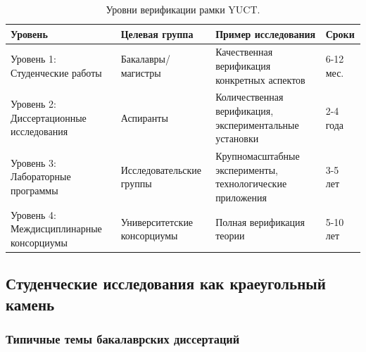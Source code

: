 \documentclass[12pt,a4paper]{article}
\begin{document}
	\begin{table}[h]
		\centering
		\begin{tabular}{p{}p{}p{}p{}}
			\toprule
			\textbf{Уровень} & \textbf{Целевая группа} & \textbf{Пример исследования} & \textbf{Сроки} \\
			\midrule
			Уровень 1: Студенческие работы & Бакалавры/магистры & Качественная верификация конкретных аспектов & 6-12 мес. \\
			Уровень 2: Диссертационные исследования & Аспиранты & Количественная верификация, экспериментальные установки & 2-4 года \\
			Уровень 3: Лабораторные программы & Исследовательские группы & Крупномасштабные эксперименты, технологические приложения & 3-5 лет \\
			Уровень 4: Междисциплинарные консорциумы & Университетские консорциумы & Полная верификация теории & 5-10 лет \\
			\bottomrule
		\end{tabular}
		\caption{Уровни верификации рамки YUCT.}
		\label{tab:verification-levels}
	\end{table}
	
	\subsection{Студенческие исследования как краеугольный камень}
	
	\subsubsection{Типичные темы бакалаврских диссертаций}
	
\end{document}
